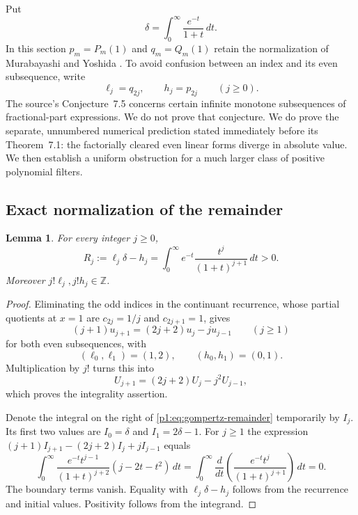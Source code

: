 \documentclass[11pt,a4paper]{article}
\newtheorem{lemma}[theorem]{Lemma}
\theoremstyle{definition}
\theoremstyle{remark}
\numberwithin{equation}{section}
\begin{document}
Put
\[
 \delta=\int_0^\infty\frac{e^{-t}}{1+t}\,dt.
\]
In this section $p_m=P_m(1)$ and $q_m=Q_m(1)$ retain the
normalization of Murabayashi and Yoshida
\cite{p1:MurabayashiYoshida2024}. To avoid confusion between an index and
its even subsequence, write
\[
 \ell_j=q_{2j},\qquad h_j=p_{2j}\qquad(j\geq0).
\]
The source's Conjecture~7.5 concerns certain infinite monotone
subsequences of fractional-part expressions. We do not prove that
conjecture. We do prove the separate, unnumbered numerical prediction
stated immediately before its Theorem~7.1: the factorially cleared even
linear forms diverge in absolute value. We then establish a uniform
obstruction for a much larger class of positive polynomial filters.

\subsection{Exact normalization of the remainder}

\begin{lemma}\label{p1:lem:gompertz-remainder}
For every integer $j\geq0$,
\begin{equation}\label{p1:eq:gompertz-remainder}
 R_j:=\ell_j\delta-h_j
 =\int_0^\infty e^{-t}\frac{t^j}{(1+t)^{j+1}}\,dt>0.
\end{equation}
Moreover $j!\ell_j,j!h_j\in\mathbb Z$.
\end{lemma}
\begin{proof}
Eliminating the odd indices in the continuant recurrence, whose partial
quotients at $x=1$ are $c_{2j}=1/j$ and $c_{2j+1}=1$, gives
\[
 (j+1)u_{j+1}=(2j+2)u_j-ju_{j-1}\qquad(j\geq1)
\]
for both even subsequences, with
\[
 (\ell_0,\ell_1)=(1,2),\qquad(h_0,h_1)=(0,1).
\]
Multiplication by $j!$ turns this into
\[
 U_{j+1}=(2j+2)U_j-j^2U_{j-1},
\]
which proves the integrality assertion.

Denote the integral on the right of
\eqref{p1:eq:gompertz-remainder} temporarily by $I_j$. Its first two values
are $I_0=\delta$ and $I_1=2\delta-1$. For $j\geq1$ the expression
$(j+1)I_{j+1}-(2j+2)I_j+jI_{j-1}$ equals
\[
 \int_0^\infty
  \frac{e^{-t}t^{j-1}}{(1+t)^{j+2}}(j-2t-t^2)\,dt
 =\int_0^\infty\frac{d}{dt}
   \left(\frac{e^{-t}t^j}{(1+t)^{j+1}}\right)\,dt=0.
\]
The boundary terms vanish. Equality with $\ell_j\delta-h_j$ follows
from the recurrence and initial values. Positivity follows from the
integrand.
\end{proof}
\end{document}
